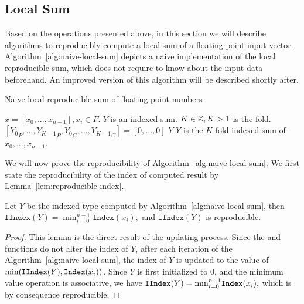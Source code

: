 \subsection{Local Sum}
  Based on the operations presented above, in this section we will describe algorithms
  to reproducibly compute a local sum of a floating-point input vector.
  Algorithm~\ref{alg:naive-local-sum} depicts a naive implementation of the
  local reproducible sum, which does not require to know about the input data beforehand.
  An improved version of this algorithm will be described shortly after.

  \begin{alg}
    Naive local reproducible sum of floating-point numbers
    \label{alg:naive-local-sum}
    \begin{algorithmic}[1]
      \Require
        $x = [x_0, ..., x_{n - 1}], x_i \in F$.
        $Y$ is an indexed sum.
        $K \in \mathbb{Z}, K > 1$ is the fold.
        \State $[{Y_0}_P, ..., {Y_{K - 1}}_P, {Y_0}_C, ..., {Y_{K - 1}}_C] = [0, ..., 0]$
          \State {}
          \State {}
          \State {}
        \EndFor
        \State \Return $Y$
      \EndFunction
      \Ensure
        \Statex $Y$ is the $K$-fold indexed sum of $x_0, ..., x_{n - 1}$.
    \end{algorithmic}
  \end{alg}

  We will now prove the reproducibility of Algorithm~\ref{alg:naive-local-sum}.
  We first state the reproducibility of the index of computed result by
  Lemma~\ref{lem:reproducible-index}.
  \begin{lem}
    Let $Y$ be the indexed-type computed by Algorithm~\ref{alg:naive-local-sum},
    then
    \(
      \mathtt{IIndex}(Y) = \min_{i=0}^{n-1} \mathtt{Index}(x_i),
    \)
    and $\mathtt{IIndex}(Y)$ is reproducible.
    \label{lem:reproducible-index}
  \end{lem}
  \begin{proof}
    This lemma is the direct result of the updating process.
    Since the  and  functions do not alter
    the index of $Y$, after each iteration of the Algorithm~\ref{alg:naive-local-sum},
    the index of $Y$ is updated to the value of $\text{min}(\mathtt{IIndex}(Y), \mathtt{Index}(x_i))$.
    Since $Y$ is first initialized to $0$, 
    and the minimum value operation is associative, we have
    \(
      \mathtt{IIndex}(Y) = \text{min}_{i=0}^{n-1} \mathtt{Index}(x_i),
    \)
    which is by consequence reproducible.
  \end{proof}


